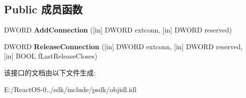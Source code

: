 \subsection*{Public 成员函数}
\begin{DoxyCompactItemize}
\item 
\mbox{\label{interface_i_external_connection_a91e7ef711521fef4302b72c329c69fa8}} 
D\+W\+O\+RD {\bfseries Add\+Connection} (\mbox{[}in\mbox{]} D\+W\+O\+RD extconn, \mbox{[}in\mbox{]} D\+W\+O\+RD reserved)
\item 
\mbox{\label{interface_i_external_connection_adc98923d4b87a6930dd33cb5f5d82d3c}} 
D\+W\+O\+RD {\bfseries Release\+Connection} (\mbox{[}in\mbox{]} D\+W\+O\+RD extconn, \mbox{[}in\mbox{]} D\+W\+O\+RD reserved, \mbox{[}in\mbox{]} B\+O\+OL f\+Last\+Release\+Closes)
\end{DoxyCompactItemize}


该接口的文档由以下文件生成\+:\begin{DoxyCompactItemize}
\item 
E\+:/\+React\+O\+S-\/0../sdk/include/psdk/objidl.\+idl\end{DoxyCompactItemize}
